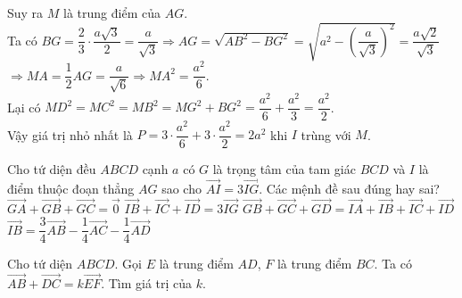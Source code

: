 \begin{ex}
{\begin{enumerate}[a)]
			Suy ra $M$ là trung điểm của $AG$.\\
			Ta có $BG=\dfrac{2}{3} \cdot \dfrac{a\sqrt{3}}{2}=\dfrac{a}{\sqrt{3}}\Rightarrow AG=\sqrt{AB^2-BG^2}=\sqrt{a^2-{{\left(\dfrac{a}{\sqrt{3}}\right)}^2}}=\dfrac{a\sqrt{2}}{\sqrt{3}}$\\
			$\Rightarrow MA=\dfrac{1}{2}AG=\dfrac{a}{\sqrt{6}}\Rightarrow MA^2=\dfrac{a^2}{6}$.\\
			Lại có $MD^2=MC^2=MB^2=MG^2+BG^2=\dfrac{a^2}{6}+\dfrac{a^2}{3}=\dfrac{a^2}{2}$.\\
			Vậy giá trị nhỏ nhất là $P=3 \cdot \dfrac{a^2}{6}+3 \cdot \dfrac{a^2}{2}=2a^2$ khi $I$ trùng với $M$.
		\end{enumerate}
		
	}
\end{ex}
\begin{ex}
	Cho tứ diện đều $ABCD$ cạnh $a$ có $G$ là trọng tâm của tam giác $BCD$ và $I$ là điểm thuộc đoạn thẳng $AG$ sao cho $\vec{AI}=3\vec{IG}$. Các mệnh đề sau đúng hay sai?
	\choiceTF
	{$\vec{GA}+\vec{GB}+\vec{GC}=\vec{0}$}
	{\True $\vec{IB}+\vec{IC}+\vec{ID}=3\vec{IG}$}
	{\True $\vec{GB}+\vec{GC}+\vec{GD}=\vec{IA}+\vec{IB}+\vec{IC}+\vec{ID}$}
	{\True $\vec{IB}=\dfrac{3}{4}\vec{AB}-\dfrac{1}{4}\vec{AC}-\dfrac{1}{4}\vec{AD}$}
\end{ex}
\begin{ex}
	Cho tứ diện $ABCD$. Gọi $E$ là trung điểm $AD$, $F$ là trung điểm $BC$. Ta có $\vec{AB}+\vec{DC}= k\vec{EF}$. Tìm giá trị của $k$.
\end{ex}
